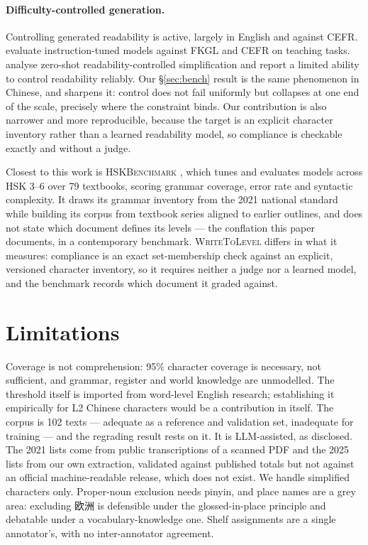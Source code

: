 \documentclass[11pt]{article}
\begin{document}
\paragraph{Difficulty-controlled generation.} Controlling generated readability
is active, largely in English and against CEFR.
\citet{imperial2023flesch} evaluate instruction-tuned models against FKGL and
CEFR on teaching tasks. \citet{barayan2025analyzing} analyse zero-shot
readability-controlled simplification and report a limited ability to control
readability reliably. Our \S\ref{sec:bench} result is the same phenomenon in
Chinese, and sharpens it: control does not fail uniformly but collapses at one
end of the scale, precisely where the constraint binds. Our contribution is
also narrower and more reproducible, because the target is an explicit
character inventory rather than a learned readability model, so compliance is
checkable exactly and without a judge.

Closest to this work is \textsc{HSKBenchmark} \citep{yang2026hskbenchmark},
which tunes and evaluates models across HSK 3--6 over 79 textbooks, scoring
grammar coverage, error rate and syntactic complexity. It draws its grammar
inventory from the 2021 national standard while building its corpus from
textbook series aligned to earlier outlines, and does not state which document
defines its levels --- the conflation this paper documents, in a contemporary
benchmark. \textsc{WriteToLevel} differs in what it measures: compliance is an
exact set-membership check against an explicit, versioned character inventory,
so it requires neither a judge nor a learned model, and the benchmark records
which document it graded against.

\section{Limitations}
\label{sec:limitations}

Coverage is not comprehension: 95\% character coverage is necessary, not
sufficient, and grammar, register and world knowledge are unmodelled. The
threshold itself is imported from word-level English research; establishing it
empirically for L2 Chinese characters would be a contribution in itself. The
corpus is 102 texts --- adequate as a reference and validation set, inadequate
for training --- and the regrading result rests on it. It is LLM-assisted, as
disclosed. The 2021 lists come from public transcriptions of a scanned PDF and
the 2025 lists from our own extraction, validated against published totals but
not against an official machine-readable release, which does not exist. We
handle simplified characters only. Proper-noun exclusion needs pinyin, and
place names are a grey area: excluding 欧洲 is defensible under the
glossed-in-place principle and debatable under a vocabulary-knowledge one.
Shelf assignments are a single annotator's, with no inter-annotator agreement.
\end{document}
